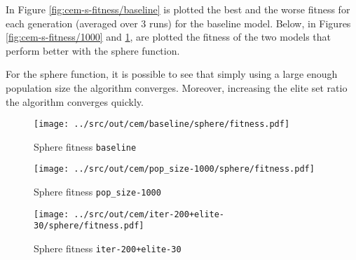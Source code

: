 In Figure \ref{fig:cem-s-fitness/baseline} is plotted the best and the worse fitness for each generation (averaged over 3 runs) for the baseline model. Below, in Figures \ref{fig:cem-s-fitness/1000} and \ref{fig:cem-s-fitness/200}, are plotted the fitness of the two models that perform better with the sphere function.

For the sphere function, it is possible to see that simply using a large enough population size the algorithm converges. 
Moreover, increasing the elite set ratio the algorithm converges quickly.
 
 \begin{figure}[H]
 	\centering
 	\begin{minipage}[b]{.6\textwidth}
 		\texttt{[image: ../src/out/cem/baseline/sphere/fitness.pdf]}	
 	\end{minipage}
	 \caption{Sphere fitness \texttt{baseline}}
	 \label{fig:cem-s-fitness/baseline}
	 
	 \begin{minipage}[b]{.6\textwidth}
	 	\texttt{[image: ../src/out/cem/pop\_size-1000/sphere/fitness.pdf]}	
	 \end{minipage}
	 \caption{Sphere fitness \texttt{pop\_size-1000}}
	 \label{fig:cem-s-fitness/1000}
	 
	 \begin{minipage}[b]{.6\textwidth}
	 	\texttt{[image: ../src/out/cem/iter-200+elite-30/sphere/fitness.pdf]}	
	 \end{minipage}
	 \caption{Sphere fitness \texttt{iter-200+elite-30}}
	 \label{fig:cem-s-fitness/200}
\end{figure}

